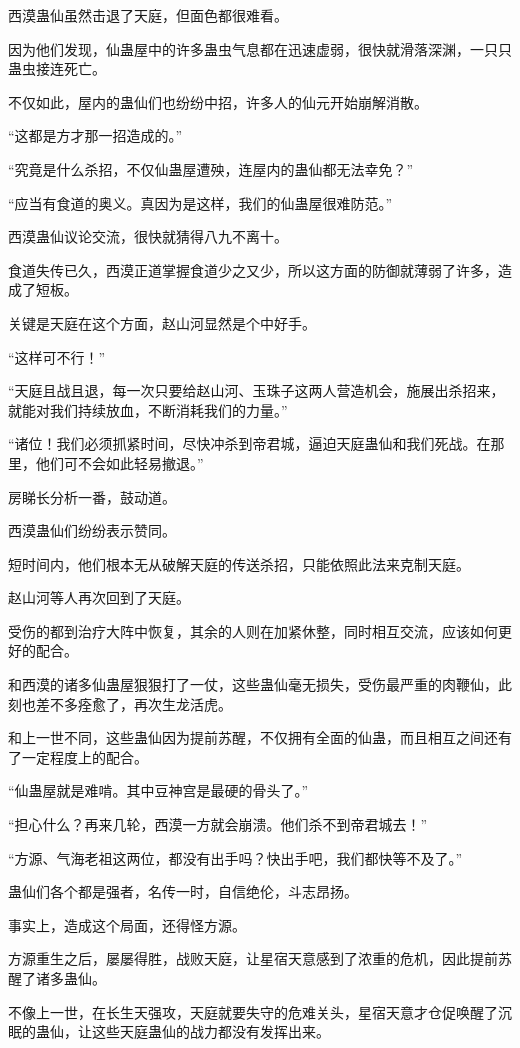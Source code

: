 \begin{this_body}
西漠蛊仙虽然击退了天庭，但面色都很难看。

因为他们发现，仙蛊屋中的许多蛊虫气息都在迅速虚弱，很快就滑落深渊，一只只蛊虫接连死亡。

不仅如此，屋内的蛊仙们也纷纷中招，许多人的仙元开始崩解消散。

“这都是方才那一招造成的。”

“究竟是什么杀招，不仅仙蛊屋遭殃，连屋内的蛊仙都无法幸免？”

“应当有食道的奥义。真因为是这样，我们的仙蛊屋很难防范。”

西漠蛊仙议论交流，很快就猜得八九不离十。

食道失传已久，西漠正道掌握食道少之又少，所以这方面的防御就薄弱了许多，造成了短板。

关键是天庭在这个方面，赵山河显然是个中好手。

“这样可不行！”

“天庭且战且退，每一次只要给赵山河、玉珠子这两人营造机会，施展出杀招来，就能对我们持续放血，不断消耗我们的力量。”

“诸位！我们必须抓紧时间，尽快冲杀到帝君城，逼迫天庭蛊仙和我们死战。在那里，他们可不会如此轻易撤退。”

房睇长分析一番，鼓动道。

西漠蛊仙们纷纷表示赞同。

短时间内，他们根本无从破解天庭的传送杀招，只能依照此法来克制天庭。

赵山河等人再次回到了天庭。

受伤的都到治疗大阵中恢复，其余的人则在加紧休整，同时相互交流，应该如何更好的配合。

和西漠的诸多仙蛊屋狠狠打了一仗，这些蛊仙毫无损失，受伤最严重的肉鞭仙，此刻也差不多痊愈了，再次生龙活虎。

和上一世不同，这些蛊仙因为提前苏醒，不仅拥有全面的仙蛊，而且相互之间还有了一定程度上的配合。

“仙蛊屋就是难啃。其中豆神宫是最硬的骨头了。”

“担心什么？再来几轮，西漠一方就会崩溃。他们杀不到帝君城去！”

“方源、气海老祖这两位，都没有出手吗？快出手吧，我们都快等不及了。”

蛊仙们各个都是强者，名传一时，自信绝伦，斗志昂扬。

事实上，造成这个局面，还得怪方源。

方源重生之后，屡屡得胜，战败天庭，让星宿天意感到了浓重的危机，因此提前苏醒了诸多蛊仙。

不像上一世，在长生天强攻，天庭就要失守的危难关头，星宿天意才仓促唤醒了沉眠的蛊仙，让这些天庭蛊仙的战力都没有发挥出来。

\end{this_body}

